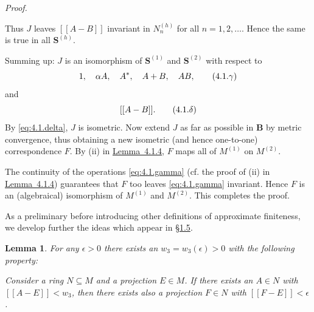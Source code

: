 \documentclass[b5paper,twoside]{article}
\newcommand{\secref}[2]{\hyperref[#1]{\mbox{\S#2}}}
\newcommand{\lemref}[2]{\hyperref[#1]{\mbox{Lemma~#2}}}
\theoremstyle{mvnplain}
\newtheorem{lemma}{Lemma}[section]
\renewenvironment{proof}[1][Proof]{%
  \par\addvspace{0.35\baselineskip}%
  \noindent\textit{#1.}\ \normalfont\ignorespaces
}{%
  \par\addvspace{0.35\baselineskip}%
}
\newcommand{\M}{\mathbf M}
\newcommand{\N}{\mathbf N}
\newcommand{\Metric}[1]{\left[\!\left[#1\right]\!\right]}
\def\M{M}%
\def\N{N}%
\def\Metric#1{[[#1]]}%
\def\mathfrak#1{#1}%
\begin{document}
\begin{proof}
Thus \(\mathfrak J\) leaves \(\Metric{A-B}\) invariant in \(\N_n^{(h)}\)
for all \(n=1,2,\ldots\). Hence the same is true in all \(\mathbf S^{(h)}\).

Summing up: \(\mathfrak J\) is an isomorphism of \(\mathbf S^{(1)}\) and
\(\mathbf S^{(2)}\) with respect to
\begin{equation}\label{eq:4.1.gamma}
  1,\quad \alpha A,\quad A^*,\quad A+B,\quad AB,
  \tag{4.1.\ensuremath{\gamma}}
\end{equation}
and
\begin{equation}\label{eq:4.1.delta}
  \Metric{A-B}.
  \tag{4.1.\ensuremath{\delta}}
\end{equation}
By \eqref{eq:4.1.delta}, \(\mathfrak J\) is isometric. Now extend
\(\mathfrak J\) as far as possible in \(\mathbf B\) by metric convergence,
thus obtaining a new isometric (and hence one-to-one) correspondence
\(\mathfrak F\). By (ii) in \lemref{lem:4.1.4}{4.1.4}, \(\mathfrak F\) maps
all of \(\M^{(1)}\) on \(\M^{(2)}\).

The continuity of the operations \eqref{eq:4.1.gamma} (cf. the proof of (ii)
in \lemref{lem:4.1.4}{4.1.4}) guarantees that \(\mathfrak F\) too leaves
\eqref{eq:4.1.gamma} invariant. Hence \(\mathfrak F\) is an (algebraical)
isomorphism of \(\M^{(1)}\) and \(\M^{(2)}\). This completes the proof.
\end{proof}
 
As a preliminary before introducing other definitions of approximate
finiteness, we develop further the ideas which appear in
\secref{sec:1.5}{1.5}.

\begin{lemma}\label{lem:4.2.1}
For any \(\epsilon>0\) there exists an
\(w_3=w_3(\epsilon)>0\) with the following property:

Consider a ring \(\N\subseteq\M\) and a projection \(E\in\M\). If there
exists an \(A\in\N\) with \(\Metric{A-E}<w_3\), then there exists also a
projection \(F\in\N\) with \(\Metric{F-E}<\epsilon\).
\end{lemma}
\end{document}

